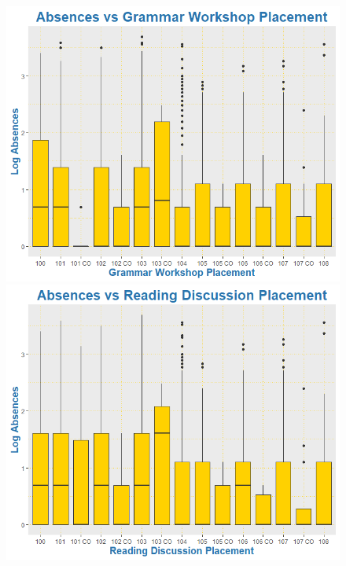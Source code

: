 \documentclass[12pt,letterpaper]{article}
\begin{document}
\begin{figure}[!ht]
  \centering
  \begin{minipage}[b]{0.49\textwidth}
    \includegraphics[width=\textwidth]{Plots/1. Grammar Workshop Placement.png}
  \end{minipage}
  \hfill
  \begin{minipage}[b]{0.49\textwidth}
    \includegraphics[width=\textwidth]{Plots/1. Reading Discussion Placement.png}
  \end{minipage}
\end{figure}
\end{document}
